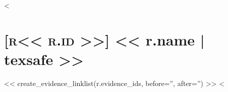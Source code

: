 <%
\section*{\hypertarget{religion<<r.id>>}{\textsc{[r<< r.id >>]}} << r.name | texsafe >>}

<< create_evidence_linklist(r.evidence_ids, before='', after='') >>
<%
